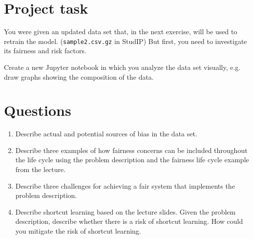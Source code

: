 

\newcommand{\dozenten}{Prof.~Dr.~Steffen Herbold}
\newcommand{\vorlesung}{Principles of AI Engineering}
\newcommand{\docauthor}{Lukas Schulte}
\newcommand{\semester}{}
\newcommand{\blattnummer}{10}
\newcommand{\bistermin}{}



\section*{Project task}

You were given an updated data set that, in the next exercise, will be used to retrain the model. (\texttt{sample2.csv.gz} in StudIP) But first, you need to investigate its fairness and risk factors.

Create a new Jupyter notebook in which you analyze the data set visually, e.g. draw graphs showing the composition of the data.

\section*{Questions}

\begin{enumerate}
      \item Describe actual and potential sources of bias in the data set.
      \item
            Describe three examples of how fairness concerns can be included throughout the life cycle using the problem description and the fairness life cycle example from the lecture.
      \item
            Describe three challenges for achieving a fair system that implements the problem description.
      \item
            Describe shortcut learning based on the lecture slides.
            Given the problem description, describe whether there is a risk of shortcut learning.
            How could you mitigate the risk of shortcut learning.
\end{enumerate}



